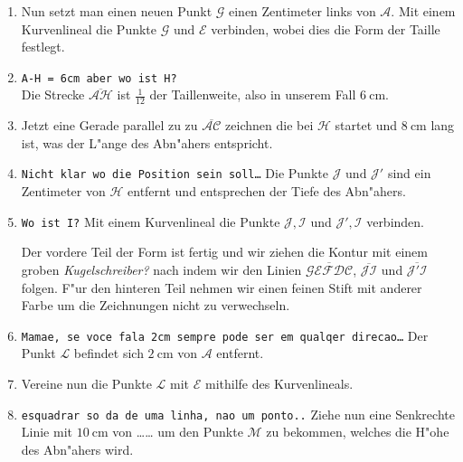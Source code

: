 \documentclass{scrartcl}
\begin{document}
\begin{enumerate}
  \item Nun setzt man einen neuen Punkt $\mathcal{G}$ einen Zentimeter links
      von $\mathcal{A}$. Mit einem Kurvenlineal die Punkte
      $\mathcal{G}\text{ und }\mathcal{E}$ verbinden, wobei dies die Form der
      Taille festlegt.

  \item \Emailct \texttt{A-H = 6cm aber wo ist H?} \\ Die Strecke
      $\overline{\mathcal{AH}}$ ist $\frac{1}{12}$ der Taillenweite, also in
      unserem Fall $\SI{6}{\centi\meter}$. 

  \item Jetzt eine Gerade parallel zu zu $\overline{\mathcal{AC}}$ zeichnen die
      bei $\mathcal{H}$ startet und $\SI{8}{\centi\meter}$ lang ist, was der
      L"ange des Abn"ahers entspricht.

    \item \Emailct \texttt{Nicht klar wo die Position sein soll\dots} Die Punkte
      $\mathcal{J}\text{ und }\mathcal{J'}$ sind ein Zentimeter von
      $\mathcal{H}$ entfernt und entsprechen der Tiefe des Abn"ahers.
     
    \item \Emailct \texttt{Wo ist I?} Mit einem Kurvenlineal die Punkte
      $\mathcal{J,I}$ und $\mathcal{J',I}$ verbinden.

      \noindent
    Der vordere Teil der Form ist fertig und wir ziehen die Kontur mit
    einem groben \Emailct \emph{Kugelschreiber?} nach indem wir den Linien
    $\overline{\mathcal{GEFDC}}$, $\overline{\mathcal{JI}}$ und 
    $\overline{\mathcal{J'I}}$ folgen. 
    F"ur den hinteren Teil nehmen wir einen feinen Stift mit anderer Farbe
    um die Zeichnungen nicht zu verwechseln.

  \item \Emailct \texttt{Mamae, se voce fala 2cm sempre pode ser em qualqer
    direcao\dots} Der Punkt $\mathcal{L}$ befindet sich $\SI{2}{\centi\meter}$
    von $\mathcal{A}$ entfernt.

  \item Vereine nun die Punkte $\mathcal{L}$ mit $\mathcal{E}$ mithilfe des
    Kurvenlineals.  

  \item \Emailct \texttt{esquadrar so da de uma linha, nao um ponto..}
    Ziehe nun eine Senkrechte Linie mit $\SI{10}{\centi\meter}$ von \dots \dots
    um den Punkte $\mathcal{M}$ zu bekommen, welches die H"ohe des Abn"ahers
    wird.


\end{enumerate}
\end{document}
